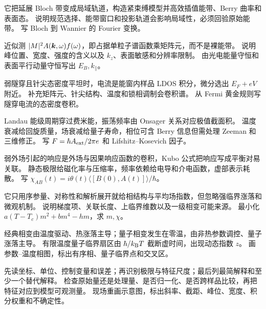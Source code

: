 {它把延展 Bloch 带变成局域轨道，构造紧束缚模型并高效插值能带、Berry 曲率和表面态。}
{说明规范选择、能带窗口和投影轨道会影响局域性，必须回验原始能带。}
{写 Bloch 到 Wannier 的 Fourier 变换。}

{近似测 $|M|^2A(\bm{k},\omega)f(\omega)$，即占据单粒子谱函数乘矩阵元，而不是裸能带。}
{说明峰位置、宽度、强度的含义以及 $k_z$、表面敏感和分辨率限制。}
{由光电能量守恒和表面平行动量守恒写出 $E_B,k_\parallel$。}

{弱隧穿且针尖态密度平坦时，电流是能窗内样品 LDOS 积分，微分选出 $E_F+eV$ 附近。}
{补充矩阵元、针尖结构、温度和锁相调制会卷积谱。}
{从 Fermi 黄金规则写隧穿电流的态密度卷积。}

{Landau 能级周期穿过费米能，振荡频率由 Onsager 关系对应极值截面积。}
{温度衰减给回旋质量，场衰减给量子寿命，相位可含 Berry 信息但需处理 Zeeman 和三维修正。}
{写 $F=\hbar A_{\rm ext}/2\pi e$ 和 Lifshitz--Kosevich 因子。}

{弱外场引起的响应是外场与因果响应函数的卷积，Kubo 公式把响应写成平衡对易关联。}
{静态极限给磁化率与压缩率，频率依赖给电导和介电函数，虚部表示耗散。}
{写 $\chi_{AB}(t)=i\theta(t)\langle[B(0),A(t)]\rangle/\hbar$。}

{它只用序参量、对称性和解析展开就给相结构与平均场指数，但忽略强临界涨落和微观机制。}
{说明梯度项、关联长度、上临界维数以及一级相变可能来源。}
{最小化 $a(T-T_c)m^2+bm^4-hm$，求 $m,\chi$。}

{经典相变由温度驱动、热涨落主导；量子相变发生在零温，由非热参数调控、量子涨落主导。}
{有限温度量子临界扇区由 $\hbar/k_{\mathrm B} T$ 截断虚时间，出现动态指数 $z$。}
{画参数--温度相图，标出有序相、量子临界点和交叉区。}

{先读坐标、单位、控制变量和误差；再识别极限与特征尺度；最后列最简解释和至少一个替代解释。}
{检查原始量还是处理量、是否归一化、是否跨样品比较，再把特征对应到模型可观测量。}
{现场重画示意图，标出斜率、截距、峰位、宽度、积分权重和不确定性。}


